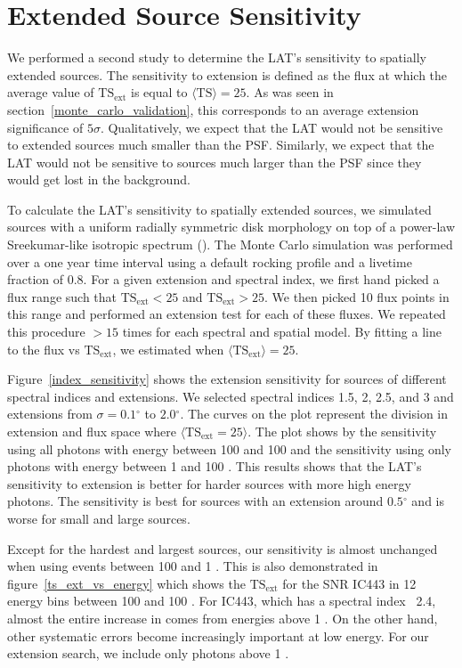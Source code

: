 \documentclass[12pt,preprint]{aastex}
\newcommand{\mev}{\text{MeV}\xspace}
\newcommand{\gev}{\text{GeV}\xspace}
\newcommand{\tsext}{{\ensuremath{\text{TS}_\text{ext}}}\xspace}
\newcommand{\ts}{\text{TS}\xspace}
\renewcommand{\deg}{\ensuremath{^\circ}\xspace}
\begin{document}
\section{Extended Source Sensitivity}\label{extension_sensitivity}

We performed a second study to determine the LAT's sensitivity
to spatially extended sources. The sensitivity to extension
is defined as the flux at which the average value of
$\tsext$ is equal to $\langle\ts\rangle=25$. As was seen in
section~\ref{monte_carlo_validation}, this corresponds to an average
extension significance of $5\sigma$.
Qualitatively, we expect that the LAT would not be sensitive to
extended sources much smaller than the PSF. Similarly,
we expect that the LAT would not be sensitive to sources
much larger than the PSF since they would get lost in the
background.

To calculate the LAT's sensitivity to spatially extended sources,
we simulated sources with a uniform radially symmetric disk
morphology on top of a power-law Sreekumar-like isotropic spectrum
(\cite{sreekumar_isotropic}).  The Monte Carlo simulation was performed
over a one year time interval using a default rocking profile and a
livetime fraction of 0.8.  For a given extension and spectral index, we
first hand picked a flux range such that $\tsext<25$ and $\tsext>25$. We
then picked 10 flux points in this range and performed an extension test
for each of these fluxes. We repeated this procedure $>15$ times for each
spectral and spatial model.  By fitting a line to the flux vs $\tsext$,
we estimated when $\langle\tsext\rangle=25$.

Figure~\ref{index_sensitivity} shows the extension sensitivity for
sources of different spectral indices and extensions.  We selected
spectral indices 1.5, 2, 2.5, and 3 and 
extensions from $\sigma=0.1\deg$ to $2.0\deg$.  The curves
on the plot represent the division in extension and flux space where
$\langle\tsext=25\rangle$.  The plot shows by the sensitivity using all
photons with energy between 100 \mev and 100 \gev and the sensitivity
using only photons with energy between 1 \gev and 100 \gev.  This results
shows that the LAT's sensitivity to extension is better for harder sources
with more high energy photons. The sensitivity is best for sources with
an extension around $0.5\deg$ and is worse for small and large sources.

Except for the hardest and largest sources, our sensitivity is almost
unchanged when using events between 100 \mev and 1 \gev.  This is also
demonstrated in figure~\ref{ts_ext_vs_energy} which shows the \tsext for
the SNR IC443 in 12 energy bins between 100 \mev and 100 \gev. For IC443,
which has a spectral index ~2.4, almost the entire increase in \ts comes
from energies above 1 \gev.  On the other hand, other systematic errors
become increasingly important at low energy. For our extension search,
we include only photons above 1 \gev.
\end{document}
